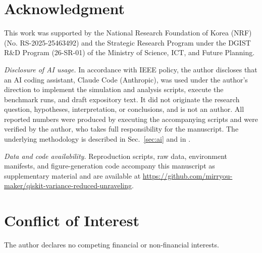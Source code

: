 \documentclass{ieeeaccess}
\begin{document}
\section*{Acknowledgment}
This work was supported by the National Research Foundation of Korea (NRF)
(No. RS-2025-25463492) and the Strategic Research Program under the DGIST R\&D Program
(26-SR-01) of the Ministry of Science, ICT, and Future Planning.

\emph{Disclosure of AI usage.} In accordance with IEEE policy, the author discloses that an AI
coding assistant, Claude Code (Anthropic), was used under the author's direction to implement the
simulation and analysis scripts, execute the benchmark runs, and draft expository text. It did not
originate the research question, hypotheses, interpretation, or conclusions, and is not an author.
All reported numbers were produced by executing the accompanying scripts and were verified by the
author, who takes full responsibility for the manuscript. The underlying methodology is described in
Sec.~\ref{sec:ai} and in \cite{you2026mumax,you2026lammps}.

\emph{Data and code availability.} Reproduction scripts, raw data, environment manifests, and
figure-generation code accompany this manuscript as supplementary material and are available
at \url{https://github.com/mirryou-maker/qiskit-variance-reduced-unraveling}.

\section*{Conflict of Interest}
The author declares no competing financial or non-financial interests.
\end{document}

